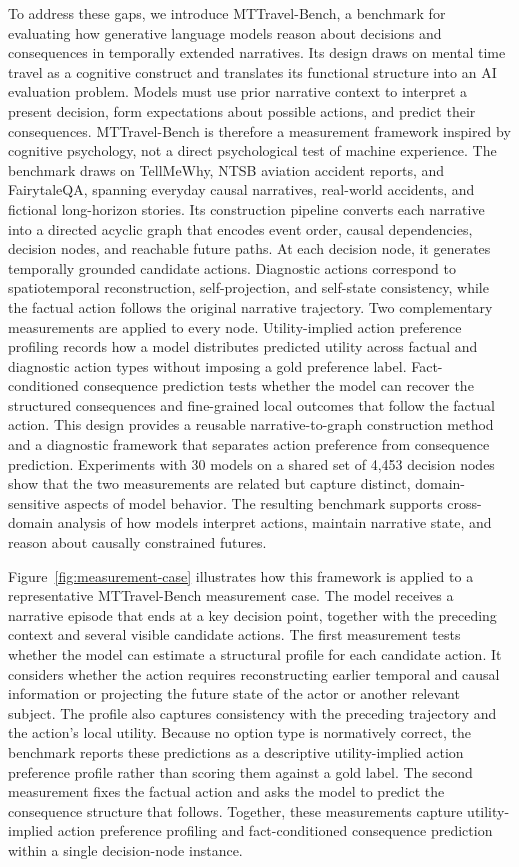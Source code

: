 \documentclass[pdflatex,sn-mathphys-num]{sn-jnl}%
\theoremstyle{thmstyleone}%
\theoremstyle{thmstyletwo}%
\theoremstyle{thmstylethree}%
\begin{document}
To address these gaps, we introduce MTTravel-Bench, a benchmark for evaluating how generative language models reason about decisions and consequences in temporally extended narratives. Its design draws on mental time travel as a cognitive construct and translates its functional structure into an AI evaluation problem. Models must use prior narrative context to interpret a present decision, form expectations about possible actions, and predict their consequences. MTTravel-Bench is therefore a measurement framework inspired by cognitive psychology, not a direct psychological test of machine experience. The benchmark draws on TellMeWhy, NTSB aviation accident reports, and FairytaleQA, spanning everyday causal narratives, real-world accidents, and fictional long-horizon stories. Its construction pipeline converts each narrative into a directed acyclic graph that encodes event order, causal dependencies, decision nodes, and reachable future paths. At each decision node, it generates temporally grounded candidate actions. Diagnostic actions correspond to spatiotemporal reconstruction, self-projection, and self-state consistency, while the factual action follows the original narrative trajectory. Two complementary measurements are applied to every node. Utility-implied action preference profiling records how a model distributes predicted utility across factual and diagnostic action types without imposing a gold preference label. Fact-conditioned consequence prediction tests whether the model can recover the structured consequences and fine-grained local outcomes that follow the factual action. This design provides a reusable narrative-to-graph construction method and a diagnostic framework that separates action preference from consequence prediction. Experiments with 30 models on a shared set of 4,453 decision nodes show that the two measurements are related but capture distinct, domain-sensitive aspects of model behavior. The resulting benchmark supports cross-domain analysis of how models interpret actions, maintain narrative state, and reason about causally constrained futures.

Figure~\ref{fig:measurement-case} illustrates how this framework is applied to a representative MTTravel-Bench measurement case. The model receives a narrative episode that ends at a key decision point, together with the preceding context and several visible candidate actions. The first measurement tests whether the model can estimate a structural profile for each candidate action. It considers whether the action requires reconstructing earlier temporal and causal information or projecting the future state of the actor or another relevant subject. The profile also captures consistency with the preceding trajectory and the action's local utility. Because no option type is normatively correct, the benchmark reports these predictions as a descriptive utility-implied action preference profile rather than scoring them against a gold label. The second measurement fixes the factual action and asks the model to predict the consequence structure that follows. Together, these measurements capture utility-implied action preference profiling and fact-conditioned consequence prediction within a single decision-node instance.
\end{document}
